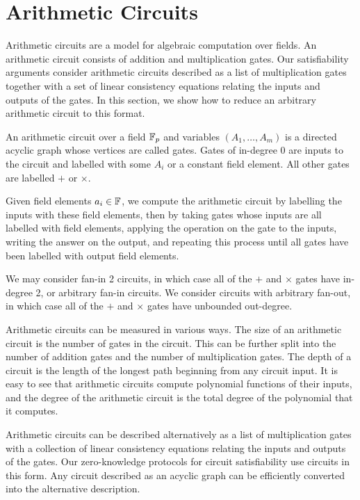 \section{Arithmetic Circuits}\label{sec:AC}

Arithmetic circuits are a model for algebraic computation over fields. An arithmetic circuit consists of addition and multiplication gates. Our satisfiability arguments consider arithmetic circuits described as a list of multiplication gates together with a set of linear consistency equations relating the inputs and outputs of the gates. 
%
In this section, we show how to reduce an arbitrary arithmetic circuit to this format.

\begin{definition} An arithmetic circuit over a field $\mathbb{F}_p$ and variables $(A_1,\ldots,A_m)$ is a directed acyclic graph whose vertices are called gates. Gates of in-degree 0 are inputs to the circuit and labelled with some $A_i$ or a constant field element. All other gates are labelled $+$ or $\times$.
\end{definition}

Given field elements $a_i \in \mathbb{F}$, we compute the arithmetic circuit by labelling the inputs with these field elements, then by taking gates whose inputs are all labelled with field elements, applying the operation on the gate to the inputs, writing the answer on the output, and repeating this process until all gates have been labelled with output field elements.

We may consider fan-in 2 circuits, in which case all of the $+$ and $\times$ gates have in-degree 2, or arbitrary fan-in circuits. We consider circuits with arbitrary fan-out, in which case all of the $+$ and $\times$ gates have unbounded out-degree.

Arithmetic circuits can be measured in various ways. The size of an arithmetic circuit is the number of gates in the circuit. This can be further split into the number of addition gates and the number of multiplication gates. The depth of a circuit is the length of the longest path beginning from any circuit input. It is easy to see that arithmetic circuits compute polynomial functions of their inputs, and the degree of the arithmetic circuit is the total degree of the polynomial that it computes.

Arithmetic circuits can be described alternatively as a list of multiplication gates with a collection of linear consistency equations relating the inputs and outputs of the gates. Our zero-knowledge protocols for circuit satisfiability use circuits in this form. Any circuit described as an acyclic graph can be efficiently converted into the alternative description.

